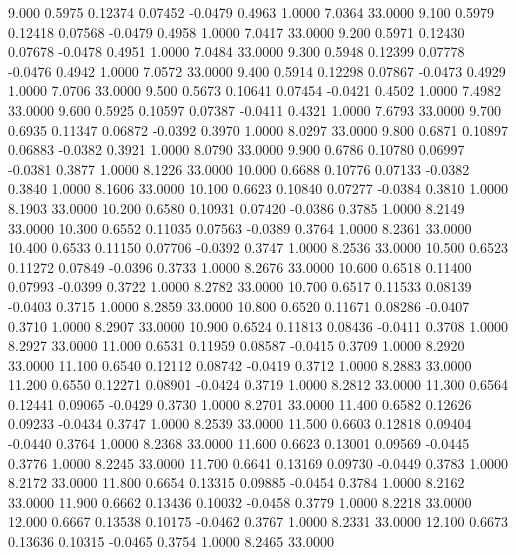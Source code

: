    9.000   0.5975   0.12374   0.07452  -0.0479   0.4963   1.0000   7.0364  33.0000
   9.100   0.5979   0.12418   0.07568  -0.0479   0.4958   1.0000   7.0417  33.0000
   9.200   0.5971   0.12430   0.07678  -0.0478   0.4951   1.0000   7.0484  33.0000
   9.300   0.5948   0.12399   0.07778  -0.0476   0.4942   1.0000   7.0572  33.0000
   9.400   0.5914   0.12298   0.07867  -0.0473   0.4929   1.0000   7.0706  33.0000
   9.500   0.5673   0.10641   0.07454  -0.0421   0.4502   1.0000   7.4982  33.0000
   9.600   0.5925   0.10597   0.07387  -0.0411   0.4321   1.0000   7.6793  33.0000
   9.700   0.6935   0.11347   0.06872  -0.0392   0.3970   1.0000   8.0297  33.0000
   9.800   0.6871   0.10897   0.06883  -0.0382   0.3921   1.0000   8.0790  33.0000
   9.900   0.6786   0.10780   0.06997  -0.0381   0.3877   1.0000   8.1226  33.0000
  10.000   0.6688   0.10776   0.07133  -0.0382   0.3840   1.0000   8.1606  33.0000
  10.100   0.6623   0.10840   0.07277  -0.0384   0.3810   1.0000   8.1903  33.0000
  10.200   0.6580   0.10931   0.07420  -0.0386   0.3785   1.0000   8.2149  33.0000
  10.300   0.6552   0.11035   0.07563  -0.0389   0.3764   1.0000   8.2361  33.0000
  10.400   0.6533   0.11150   0.07706  -0.0392   0.3747   1.0000   8.2536  33.0000
  10.500   0.6523   0.11272   0.07849  -0.0396   0.3733   1.0000   8.2676  33.0000
  10.600   0.6518   0.11400   0.07993  -0.0399   0.3722   1.0000   8.2782  33.0000
  10.700   0.6517   0.11533   0.08139  -0.0403   0.3715   1.0000   8.2859  33.0000
  10.800   0.6520   0.11671   0.08286  -0.0407   0.3710   1.0000   8.2907  33.0000
  10.900   0.6524   0.11813   0.08436  -0.0411   0.3708   1.0000   8.2927  33.0000
  11.000   0.6531   0.11959   0.08587  -0.0415   0.3709   1.0000   8.2920  33.0000
  11.100   0.6540   0.12112   0.08742  -0.0419   0.3712   1.0000   8.2883  33.0000
  11.200   0.6550   0.12271   0.08901  -0.0424   0.3719   1.0000   8.2812  33.0000
  11.300   0.6564   0.12441   0.09065  -0.0429   0.3730   1.0000   8.2701  33.0000
  11.400   0.6582   0.12626   0.09233  -0.0434   0.3747   1.0000   8.2539  33.0000
  11.500   0.6603   0.12818   0.09404  -0.0440   0.3764   1.0000   8.2368  33.0000
  11.600   0.6623   0.13001   0.09569  -0.0445   0.3776   1.0000   8.2245  33.0000
  11.700   0.6641   0.13169   0.09730  -0.0449   0.3783   1.0000   8.2172  33.0000
  11.800   0.6654   0.13315   0.09885  -0.0454   0.3784   1.0000   8.2162  33.0000
  11.900   0.6662   0.13436   0.10032  -0.0458   0.3779   1.0000   8.2218  33.0000
  12.000   0.6667   0.13538   0.10175  -0.0462   0.3767   1.0000   8.2331  33.0000
  12.100   0.6673   0.13636   0.10315  -0.0465   0.3754   1.0000   8.2465  33.0000
